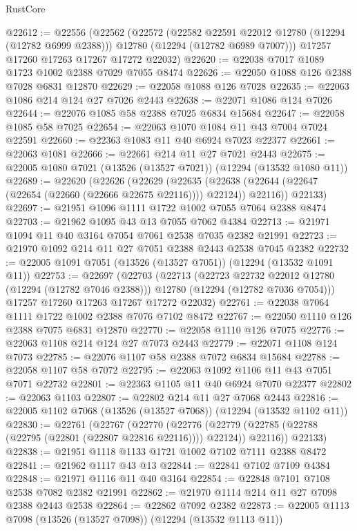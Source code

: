 \begin{lexlean}{RustCore}
\begin{coremodule}
@22612 := @22556
    (@22562
      (@22572
        (@22582 @22591 @22012 @12780 (@12294 (@12782 @6999 @2388)))
        @12780
        (@12294 (@12782 @6989 @7007)))
      @17257
      @17260
      @17263
      @17267
      @17272
      @22032)
@22620 := @22038 @7017 @1089 @1723 @1002 @2388 @7029 @7055 @8474
@22626 := @22050 @1088 @126 @2388 @7028 @6831 @12870
@22629 := @22058 @1088 @126 @7028
@22635 := @22063 @1086 @214 @124 @27 @7026 @2443
@22638 := @22071 @1086 @124 @7026
@22644 := @22076 @1085 @58 @2388 @7025 @6834 @15684
@22647 := @22058 @1085 @58 @7025
@22654 := @22063 @1070 @1084 @11 @43 @7004 @7024 @22591
@22660 := @22363 @1083 @11 @40 @6924 @7023 @22377
@22661 := @22063 @1081
@22666 := @22661 @214 @11 @27 @7021 @2443
@22675 := @22005 @1080 @7021 (@13526 (@13527 @7021)) (@12294 (@13532 @1080 @11))
@22689 := @22620
    (@22626
      (@22629
        (@22635 (@22638 (@22644 (@22647 (@22654 (@22660 (@22666 @22675 @22116)))) @22124)) @22116))
      @22133)
@22697 := @21951 @1096 @1111 @1722 @1002 @7055 @7064 @2388 @8474
@22703 := @21962 @1095 @43 @13 @7055 @7062 @4384
@22713 := @21971 @1094 @11 @40 @3164 @7054 @7061 @2538 @7035 @2382 @21991
@22723 := @21970 @1092 @214 @11 @27 @7051 @2388 @2443 @2538 @7045 @2382
@22732 := @22005 @1091 @7051 (@13526 (@13527 @7051)) (@12294 (@13532 @1091 @11))
@22753 := @22697
    (@22703
      (@22713
        (@22723 @22732 @22012 @12780 (@12294 (@12782 @7046 @2388)))
        @12780
        (@12294 (@12782 @7036 @7054)))
      @17257
      @17260
      @17263
      @17267
      @17272
      @22032)
@22761 := @22038 @7064 @1111 @1722 @1002 @2388 @7076 @7102 @8472
@22767 := @22050 @1110 @126 @2388 @7075 @6831 @12870
@22770 := @22058 @1110 @126 @7075
@22776 := @22063 @1108 @214 @124 @27 @7073 @2443
@22779 := @22071 @1108 @124 @7073
@22785 := @22076 @1107 @58 @2388 @7072 @6834 @15684
@22788 := @22058 @1107 @58 @7072
@22795 := @22063 @1092 @1106 @11 @43 @7051 @7071 @22732
@22801 := @22363 @1105 @11 @40 @6924 @7070 @22377
@22802 := @22063 @1103
@22807 := @22802 @214 @11 @27 @7068 @2443
@22816 := @22005 @1102 @7068 (@13526 (@13527 @7068)) (@12294 (@13532 @1102 @11))
@22830 := @22761
    (@22767
      (@22770
        (@22776 (@22779 (@22785 (@22788 (@22795 (@22801 (@22807 @22816 @22116)))) @22124)) @22116))
      @22133)
@22838 := @21951 @1118 @1133 @1721 @1002 @7102 @7111 @2388 @8472
@22841 := @21962 @1117 @43 @13
@22844 := @22841 @7102 @7109 @4384
@22848 := @21971 @1116 @11 @40 @3164
@22854 := @22848 @7101 @7108 @2538 @7082 @2382 @21991
@22862 := @21970 @1114 @214 @11 @27 @7098 @2388 @2443 @2538
@22864 := @22862 @7092 @2382
@22873 := @22005 @1113 @7098 (@13526 (@13527 @7098)) (@12294 (@13532 @1113 @11))

\end{coremodule}
\end{lexlean}
